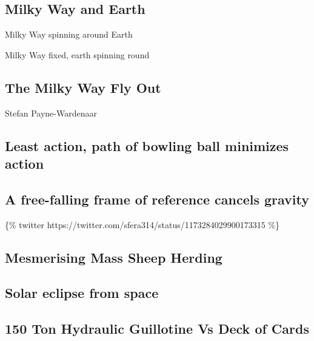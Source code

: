 \documentclass[
  letterpaper,
  DIV=11,
  numbers=noendperiod]{scrreprt}
\begin{document}
\subsection*{Milky Way and Earth}\label{milky-way-and-earth}

Milky Way spinning around Earth

Milky Way fixed, earth spinning round

\subsection*{The Milky Way Fly Out}\label{the-milky-way-fly-out}

Stefan Payne-Wardenaar

\subsection*{Least action, path of bowling ball minimizes
action}\label{least-action-path-of-bowling-ball-minimizes-action}

\subsection*{A free-falling frame of reference cancels
gravity}\label{a-free-falling-frame-of-reference-cancels-gravity}

\{\% twitter https://twitter.com/sfera314/status/1173284029900173315
\%\}

\subsection*{Mesmerising Mass Sheep
Herding}\label{mesmerising-mass-sheep-herding}

\subsection*{Solar eclipse from space}\label{solar-eclipse-from-space}

\subsection*{150 Ton Hydraulic Guillotine Vs Deck of
Cards}\label{ton-hydraulic-guillotine-vs-deck-of-cards-1}
\end{document}

